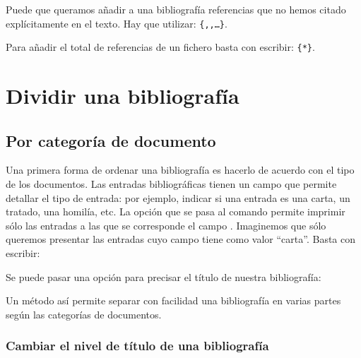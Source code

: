 Puede que queramos añadir a una bibliografía referencias que no hemos
citado explícitamente en el texto. Hay que utilizar:
\verb|{|\verb|,|\verb|,…}|.

Para añadir el total de referencias de un fichero  basta con escribir: \verb|{*}|.

\section{Dividir una bibliografía}

\subsection{Por categoría de documento}
Una primera forma de ordenar una bibliografía es hacerlo de acuerdo
con el tipo de los documentos. Las entradas bibliográficas tienen un
campo  que permite detallar el tipo de entrada:
por ejemplo, indicar si una entrada es una carta, un tratado, una
homilía, etc. La opción  que se pasa al comando
 permite imprimir sólo las entradas a las que se
corresponde el campo . Imaginemos que sólo
queremos presentar las entradas cuyo campo tiene como valor
\enquote{carta}. Basta con escribir:

\begin{latexcode}
\printbibliography[subtype=carta]
\end{latexcode}

Se puede pasar una opción  para precisar el título de
nuestra bibliografía:

\begin{latexcode}
\printbibliography[subtype=carta,title=Cartas]
\end{latexcode}

Un método así permite separar con facilidad una bibliografía en varias
partes según las categorías de documentos.

\begin{latexcode}
\printbibliography[subtype=concilio,title=Actas de concilio]
\printbibliography[subtype=tratado,title=Tratados]
\printbibliography[subtype=carta,title=Cartas]
\end{latexcode}


\subsubsection{Cambiar el nivel de título de una bibliografía}

